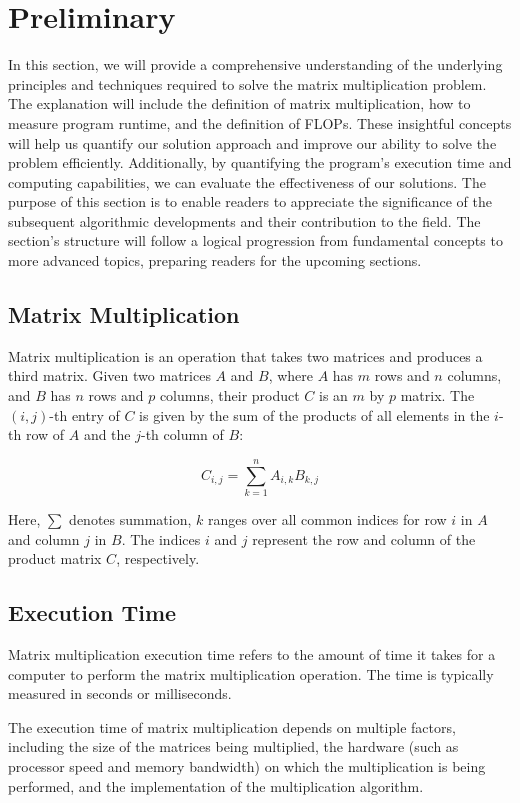 \documentclass[conference]{IEEEtran}
\begin{document}
	\section{Preliminary}
	In this section, we will provide a comprehensive understanding of the underlying principles and techniques required to solve the matrix multiplication problem. The explanation will include the definition of matrix multiplication, how to measure program runtime, and the definition of FLOPs. These insightful concepts will help us quantify our solution approach and improve our ability to solve the problem efficiently. Additionally, by quantifying the program's execution time and computing capabilities, we can evaluate the effectiveness of our solutions. The purpose of this section is to enable readers to appreciate the significance of the subsequent algorithmic developments and their contribution to the field. The section's structure will follow a logical progression from fundamental concepts to more advanced topics, preparing readers for the upcoming sections.
	\subsection{Matrix Multiplication}
	Matrix multiplication is an operation that takes two matrices and produces a third matrix. Given two matrices $A$ and $B$, where $A$ has $m$ rows and $n$ columns, and $B$ has $n$ rows and $p$ columns, their product $C$ is an $m$ by $p$ matrix. The $(i,j)$-th entry of $C$ is given by the sum of the products of all elements in the $i$-th row of $A$ and the $j$-th column of $B$:
	
	\begin{equation}
		C_{i,j} = \sum_{k=1}^{n} A_{i,k} B_{k,j}
	\end{equation}
	
	
	Here, $\sum$ denotes summation, $k$ ranges over all common indices for row $i$ in $A$ and column $j$ in $B$. The indices $i$ and $j$ represent the row and column of the product matrix $C$, respectively.
	
	\subsection{Execution Time}
	Matrix multiplication execution time refers to the amount of time it takes for a computer to perform the matrix multiplication operation. The time is typically measured in seconds or milliseconds.
	
	The execution time of matrix multiplication depends on multiple factors, including the size of the matrices being multiplied, the hardware (such as processor speed and memory bandwidth) on which the multiplication is being performed, and the implementation of the multiplication algorithm.
	
\end{document}
